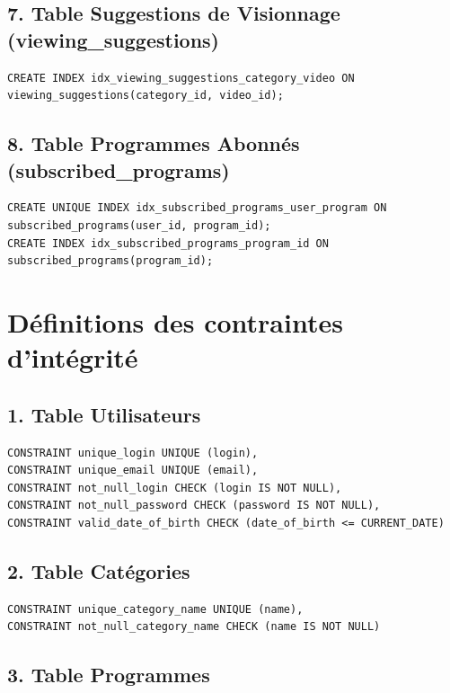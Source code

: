 \documentclass[a4paper, 12pt]{article}
\begin{document}
\subsection*{7. Table Suggestions de Visionnage (viewing\_suggestions)}

\begin{lstlisting}
CREATE INDEX idx_viewing_suggestions_category_video ON viewing_suggestions(category_id, video_id);
\end{lstlisting}

\subsection*{8. Table Programmes Abonnés (subscribed\_programs)}

\begin{lstlisting}
CREATE UNIQUE INDEX idx_subscribed_programs_user_program ON subscribed_programs(user_id, program_id);
CREATE INDEX idx_subscribed_programs_program_id ON subscribed_programs(program_id);
\end{lstlisting}

\section*{Définitions des contraintes d'intégrité}

\subsection*{1. Table Utilisateurs}

\begin{lstlisting}
CONSTRAINT unique_login UNIQUE (login),
CONSTRAINT unique_email UNIQUE (email),
CONSTRAINT not_null_login CHECK (login IS NOT NULL),
CONSTRAINT not_null_password CHECK (password IS NOT NULL),
CONSTRAINT valid_date_of_birth CHECK (date_of_birth <= CURRENT_DATE)
\end{lstlisting}

\subsection*{2. Table Catégories}

\begin{lstlisting}
CONSTRAINT unique_category_name UNIQUE (name),
CONSTRAINT not_null_category_name CHECK (name IS NOT NULL)
\end{lstlisting}

\subsection*{3. Table Programmes}
\end{document}
